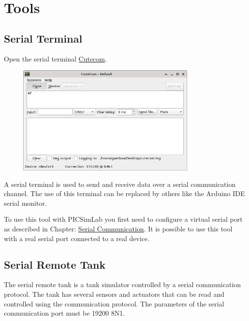 \chapter{Tools}


\section{Serial Terminal} \hypertarget{def:sterm}{}

Open the serial terminal  \href{https://github.com/neundorf/CuteCom}{Cutecom}. 

\begin{figure}[H]
\center
\includegraphics[width=0.8\textwidth]{img/cutecom.png} 
\end{figure} 

A serial terminal is used to send and receive data over a serial communication channel. 
The use of this terminal can be replaced by others like the Arduino IDE serial monitor. 

To use this tool with PICSimLab you first need to configure a virtual serial port as described in Chapter: \hyperlink{def:seriali}{Serial Communication}.
It is possible to use this tool with a real serial port connected to a real device. 


\section {Serial Remote Tank} \hypertarget{def:srtank}{}


The serial remote tank is a tank simulator controlled by a serial communication protocol.
The tank has several sensors and actuators that can be read and controlled using the communication protocol. 
The parameters of the serial communication port must be  19200 8N1. 

